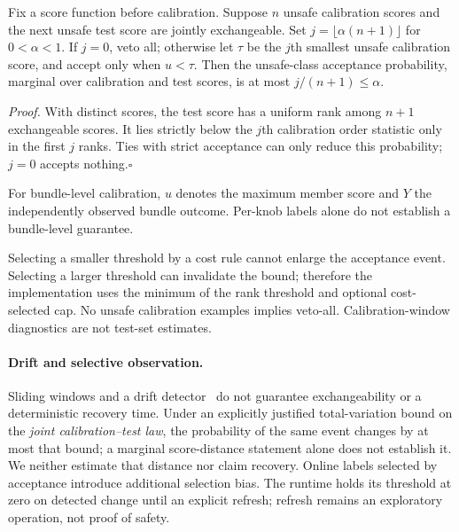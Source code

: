 \begin{proposition}\label{prop:recal}
Fix a score function before calibration. Suppose $n$ unsafe calibration scores and the next unsafe test score are jointly exchangeable. Set $j=\lfloor\alpha(n+1)\rfloor$ for $0<\alpha<1$. If $j=0$, veto all; otherwise let $\tau$ be the $j$th smallest unsafe calibration score, and accept only when $u<\tau$. Then the unsafe-class acceptance probability, marginal over calibration and test scores, is at most $j/(n+1)\le\alpha$.
\end{proposition}
\noindent\emph{Proof.} With distinct scores, the test score has a uniform rank among $n+1$ exchangeable scores. It lies strictly below the $j$th calibration order statistic only in the first $j$ ranks. Ties with strict acceptance can only reduce this probability; $j=0$ accepts nothing.\hfill$\square$

For bundle-level calibration, $u$ denotes the maximum member score and $Y$ the independently observed bundle outcome. Per-knob labels alone do not establish a bundle-level guarantee.

Selecting a smaller threshold by a cost rule cannot enlarge the acceptance event. Selecting a larger threshold can invalidate the bound; therefore the implementation uses the minimum of the rank threshold and optional cost-selected cap. No unsafe calibration examples implies veto-all. Calibration-window diagnostics are not test-set estimates.

\paragraph{Drift and selective observation.}
Sliding windows and a drift detector~\cite{Bifet2007ADWIN} do not guarantee exchangeability or a deterministic recovery time. Under an explicitly justified total-variation bound on the \emph{joint calibration--test law}, the probability of the same event changes by at most that bound; a marginal score-distance statement alone does not establish it. We neither estimate that distance nor claim recovery. Online labels selected by acceptance introduce additional selection bias. The runtime holds its threshold at zero on detected change until an explicit refresh; refresh remains an exploratory operation, not proof of safety.
